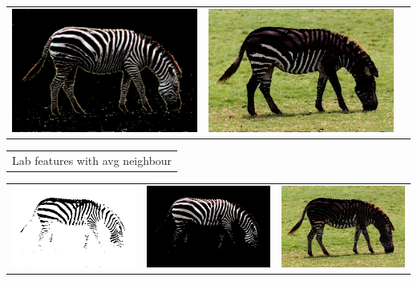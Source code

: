 \documentclass{article}
\begin{document}
\begin{center}
\begin{tabular}{c c c}
 \includegraphics[width=.37\linewidth]{../image-segmentation/output/add-Lab-neighbor-diff-feature/zebra_seg1.jpg} & \includegraphics[width=.37\linewidth]{../image-segmentation/output/add-Lab-neighbor-diff-feature/zebra_seg2.jpg} \\
  
 \end{tabular}
 \begin{tabular}{c}

Lab features with avg neighbour \\
\end{tabular}
 \begin{tabular}{c c c} 

 \includegraphics[width=.37\linewidth]{../image-segmentation/output/add-Lab-neighbor-avg-feature/zebra_mask.jpg} & 
 
 \includegraphics[width=.37\linewidth]{../image-segmentation/output/add-Lab-neighbor-avg-feature/zebra_seg1.jpg} & \includegraphics[width=.37\linewidth]{../image-segmentation/output/add-Lab-neighbor-avg-feature/zebra_seg2.jpg} \\
  
 \end{tabular}
 
 
\end{center}




%
\end{document}
